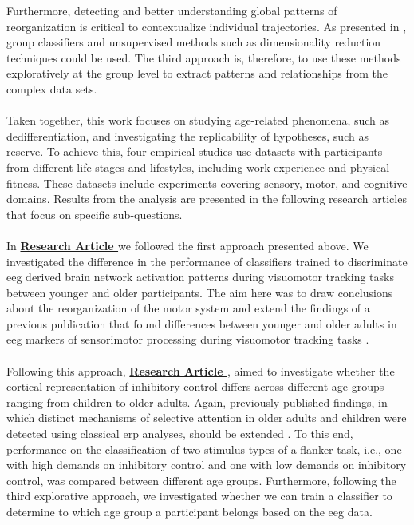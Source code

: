 Furthermore, detecting and better understanding global patterns of reorganization is critical to contextualize individual trajectories. As presented in , group classifiers and unsupervised methods such as dimensionality reduction techniques could be used. The third approach is, therefore, to use these methods exploratively at the group level to extract patterns and relationships from the complex data sets.\\
\\
Taken together, this work focuses on studying age-related phenomena, such as dedifferentiation, and investigating the replicability of hypotheses, such as reserve. To achieve this, four empirical studies use datasets with participants from different life stages and lifestyles, including work experience and physical fitness. These datasets include experiments covering sensory, motor, and cognitive domains. Results from the analysis are presented in the following research articles that focus on specific sub-questions.\\
\\
In \textbf{\hyperref[pub:paperI]{Research Article }} we followed the first approach presented above. We investigated the difference in the performance of classifiers trained to discriminate \gls{eeg} derived brain network activation patterns during visuomotor tracking tasks between younger and older participants. The aim here was to draw conclusions about the reorganization of the motor system and extend the findings of a previous publication that found differences between younger and older adults in \gls{eeg} markers of sensorimotor processing during visuomotor tracking tasks \cite{Vieluf2018}.\\
\\
Following this approach, \textbf{\hyperref[pub:paperII]{Research Article }}, aimed to investigate whether the cortical representation of inhibitory control differs across different age groups ranging from children to older adults. Again, previously published findings, in which distinct mechanisms of selective attention in older adults and children were detected using classical \gls{erp} analyses, should be extended \cite{Reuter2019}. To this end, performance on the classification of two stimulus types of a flanker task, i.e., one with high demands on inhibitory control and one with low demands on inhibitory control, was compared between different age groups. Furthermore, following the third explorative approach, we investigated whether we can train a classifier to determine to which age group a participant belongs based on the \gls{eeg} data.\\
